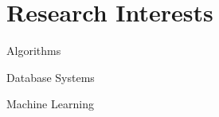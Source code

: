 
\section{Research Interests}\vspace{-1.0em}

\begin{multicols}{3}
	\begin{compactitem}
		\item Algorithms 
		\item Database Systems
		\item Machine Learning
	\end{compactitem}
\end{multicols}
